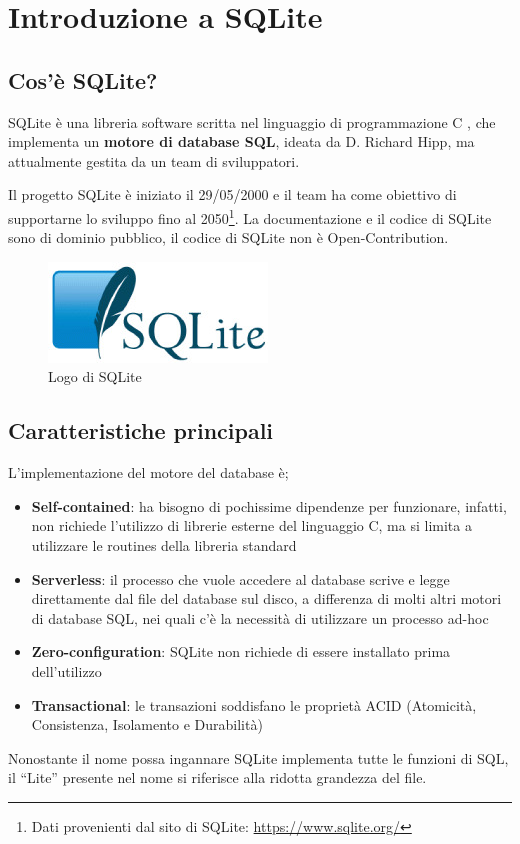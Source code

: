 
\chapter{Introduzione a SQLite}


\section{Cos’è SQLite?}
SQLite è una libreria software scritta nel linguaggio di programmazione C \cite{clanguage}, che implementa un \textbf{motore di database SQL}, ideata da D. Richard Hipp, ma attualmente gestita da un team di sviluppatori.

Il progetto SQLite è iniziato il 29/05/2000 e il team ha come obiettivo di supportarne lo sviluppo fino al 2050\footnote{Dati provenienti dal sito di SQLite: \url{https://www.sqlite.org/}}.
La documentazione e il codice di SQLite sono di dominio pubblico, il codice di SQLite non è Open-Contribution. 

\begin{figure}[ht]
	\centering
	\caption{Logo di SQLite}
	\label{fig:sqlitelogo}
	\includegraphics[scale=0.5]{assets/logo_sqlite}
\end{figure}

\section{Caratteristiche principali}
L’implementazione del motore del database è;
\begin{itemize}
	\item \textbf{Self-contained}: ha bisogno di pochissime dipendenze per funzionare, infatti, non richiede l’utilizzo di librerie esterne del linguaggio C, ma si limita a utilizzare le routines della libreria standard \cite{cstandardlibrary}
	\item \textbf{Serverless}: il processo che vuole accedere al database scrive e legge direttamente dal file del database sul disco, a differenza di molti altri motori di database SQL, nei quali c’è la necessità di utilizzare un processo ad-hoc
	\item \textbf{Zero-configuration}: SQLite non richiede di essere installato prima dell’utilizzo
	\item \textbf{Transactional}: le transazioni soddisfano le proprietà ACID (Atomicità, Consistenza, Isolamento e Durabilità) \cite{acid}
\end{itemize}
Nonostante il nome possa ingannare SQLite implementa tutte le funzioni di SQL, il “Lite” presente nel nome si riferisce alla ridotta grandezza del file.

